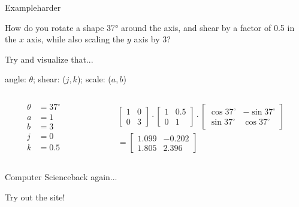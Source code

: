 \documentclass{beamer}
\begin{document}
\begin{frame}{Example}{harder}

  {\Large How do you rotate a shape 37° around the axis, and shear by a factor of
          0.5 in the $x$ axis, while also scaling the $y$ axis by 3?} \pause
      
  Try and visualize that... \pause

  angle: $\theta$; shear: ($j, k$); scale: ($a, b$)

  \vspace{1cm}

  \begin{columns}
    \begin{column}{0.3\textwidth}
      \begin{align*}
        \theta &= 37^{\circ} \\
        a &= 1 \\
        b &= 3 \\
        j &= 0 \\
        k &= 0.5
      \end{align*} \pause
    \end{column}
    \begin{column}{0.7\textwidth}
      \begin{align*}
        \begin{bmatrix}
          1 & 0 \\
          0 & 3
        \end{bmatrix}
        \cdot
        \begin{bmatrix}
          1 & 0.5 \\
          0 & 1
        \end{bmatrix}
        \cdot
        \begin{bmatrix}
          \cos{37^{\circ}} & -\sin{37^{\circ}} \\
          \sin{37^{\circ}} & \cos{37^{\circ}}
        \end{bmatrix} \\
        =
        \begin{bmatrix}
          1.099 & -0.202 \\
          1.805 & 2.396
        \end{bmatrix}
      \end{align*}
    \end{column}
  \end{columns}
\end{frame}

\begin{frame}{Computer Science}{back again...}

  \begin{center}
    \huge Try out the site!

    \vspace{1cm}


  \end{center}

\end{frame}
\end{document}
